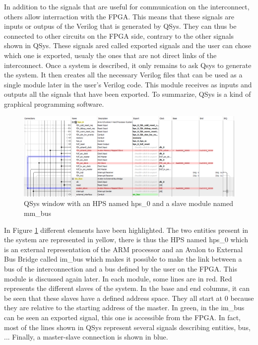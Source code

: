In addition to the signals that are useful for communication on the interconnect, others allow interraction 
with the FPGA. This means that these signals are inputs or outpus of the Verilog that is generated
by QSys. They can thus be connected to other circuits on the FPGA side, contrary to the other
signals shown in QSys. These signals ared called exported signals and the user can chose which one
is exported, usualy the ones that are not direct links of the interconnect. Once a system is 
described, it only
remains to ask Qsys to generate the system. It then creates all the necessary Verilog files that 
can be used as a single module later in the user's Verilog code. This module receives as inputs and 
outputs all the signals that have been exported. To summarize, QSys is a kind of graphical 
programming software.

\begin{figure}[H]
    \centering
    \includegraphics[width=\linewidth]{Chapter2-FPGA_Flow/res/qsys.PNG}
    \caption{QSys window with an HPS named hps\_0 and a slave module named mm\_bus}
    \label{fig:tools/qsys}
\end{figure}

In Figure \ref{fig:tools/qsys} different elements have been highlighted. The two entities present in the system are 
represented in yellow, there is thus the HPS named hps\_0 which is an external representation of the 
ARM processor and an Avalon to External Bus Bridge called im\_bus which makes it possible to make 
the link between a bus of the interconnection and a bus defined by the user on the FPGA. This module 
is discussed again later. In each module, some lines are in red. Red represents the 
different slaves of the system. In the base and end columns, it can be seen that these slaves have 
a defined address space. They all start at 0 because they are relative to the starting address of 
the master. In green, in the im\_bus can be seen an exported signal, this one is accessible 
from the FPGA. In fact, most of the lines shown in QSys represent several signals describing entities,
 bus, ... Finally, a master-slave connection is shown in blue.

